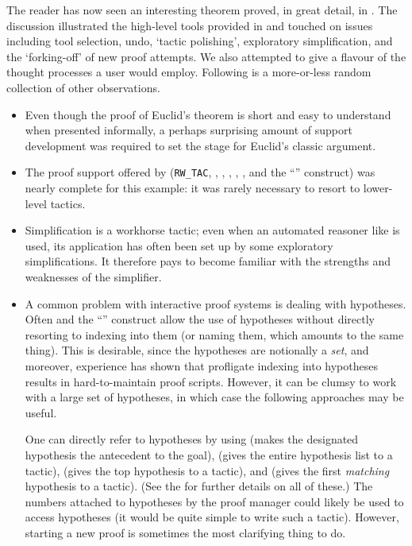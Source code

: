 The reader has now seen an interesting theorem proved, in great detail,
in \holn{}. The discussion illustrated the high-level tools provided in
 and touched on issues including tool selection, undo,
`tactic polishing', exploratory simplification, and the `forking-off' of
new proof attempts. We also attempted to give a flavour of the thought
processes a user would employ. Following is a more-or-less random
collection of other observations.
\begin{itemize}

\item Even though the proof of Euclid's theorem is short and easy to
understand when presented informally, a perhaps surprising amount of
support development was required to set the stage for Euclid's classic
argument.

\item The proof support offered by 
(\verb+RW_TAC+, , , ,
, , and the ``'' construct) was
nearly complete for this example: it was rarely necessary to resort to
lower-level tactics.

\item Simplification is a workhorse tactic; even when an automated
reasoner like  is used, its application has often been
set up by some exploratory simplifications. It therefore pays to become
familiar with the strengths and weaknesses of the simplifier.

\item A common problem with interactive proof systems is dealing with
hypotheses. Often  and the ``'' construct allow
the use of hypotheses without directly resorting to indexing into them
(or naming them, which amounts to the same thing). This is desirable,
since the hypotheses are notionally a {\it set}, and moreover,
experience has shown that profligate indexing into hypotheses results in
hard-to-maintain proof scripts. However, it can be clumsy to work with a
large set of hypotheses, in which case the following approaches may be
useful.

One can directly refer to hypotheses by using  (makes
the designated hypothesis the antecedent to the goal),
 (gives the entire hypothesis list to a tactic),
 (gives the top hypothesis to a tactic), and
 (gives the first {\it matching\/} hypothesis to a
tactic). (See the \REFERENCE{} for further details on all of these.)
The numbers attached to hypotheses by the proof manager could likely
be used to access hypotheses (it would be quite simple to write such a
tactic). However, starting a new proof is sometimes the most
clarifying thing to do.


\end{itemize}
